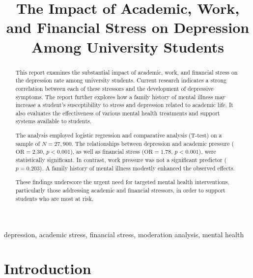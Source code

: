 \documentclass[conference]{IEEEtran}
\begin{document}
\title{The Impact of Academic, Work, and Financial Stress on Depression Among University Students\\}

\author{
}

\maketitle

\begin{abstract}
This report examines the substantial impact of academic, work, and financial stress on the depression rate among university students. Current research indicates a strong correlation between each of these stressors and the development of depressive symptoms. The report further explores how a family history of mental illness may increase a student's susceptibility to stress and depression related to academic life. It also evaluates the effectiveness of various mental health treatments and support systems available to students. 

The analysis employed logistic regression and comparative analysis (T-test) on a sample of $N = 27,900$. The relationships between depression and academic pressure ($\mathrm{OR} = 2.30$, $p < 0.001$), as well as financial stress ($\mathrm{OR} = 1.78$, $p < 0.001$), were statistically significant. In contrast, work pressure was not a significant predictor ($p = 0.203$). A family history of mental illness modestly enhanced the observed effects. 

These findings underscore the urgent need for targeted mental health interventions, particularly those addressing academic and financial stressors, in order to support students who are most at risk.
\end{abstract}

\begin{IEEEkeywords}
depression, academic stress, financial stress, moderation analysis, mental health
\end{IEEEkeywords}

\section{Introduction}
\end{document}
